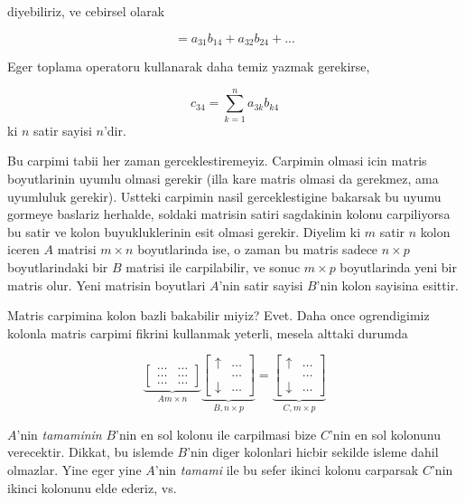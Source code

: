 \documentclass[12pt,fleqn]{article}\usepackage{../common}
\begin{document}
diyebiliriz, ve cebirsel olarak

$$ = a_{31}b_{14} + a_{32}b_{24} + ... $$

Eger toplama operatoru kullanarak daha temiz yazmak gerekirse,

$$ c_{34} = \sum_{k=1}^{n} a_{3k}b_{k4} $$
ki $n$ satir sayisi $n$'dir. 

Bu carpimi tabii her zaman gerceklestiremeyiz. Carpimin olmasi icin matris
boyutlarinin uyumlu olmasi gerekir (illa kare matris olmasi da gerekmez,
ama uyumluluk gerekir). Ustteki carpimin nasil gerceklestigine bakarsak bu
uyumu gormeye baslariz herhalde, soldaki matrisin satiri sagdakinin kolonu
carpiliyorsa bu satir ve kolon buyukluklerinin esit olmasi gerekir. Diyelim
ki $m$ satir $n$ kolon iceren $A$ matrisi $m \times n$ boyutlarinda ise, o
zaman bu matris sadece $n \times p$ boyutlarindaki bir $B$ matrisi ile
carpilabilir, ve sonuc $m \times p$ boyutlarinda yeni bir matris
olur. Yeni matrisin boyutlari $A$'nin satir sayisi $B$'nin kolon sayisina
esittir. 

Matris carpimina kolon bazli bakabilir miyiz? Evet. Daha once ogrendigimiz
kolonla matris carpimi fikrini kullanmak yeterli, mesela alttaki durumda

$$ 
\underbrace{
\left[\begin{array}{rr}
\dots & \dots   \\
\dots & \dots   \\
\dots & \dots 
\end{array}\right]
}_{A m \times n}
\underbrace{
\left[\begin{array}{rr}
\uparrow &  \dots\\
&  \dots\\
\downarrow & \dots 
\end{array}\right] 
}_{B, n \times p}
=
\underbrace{
\left[\begin{array}{rr}
\uparrow &  \dots \\
&  \dots \\
\downarrow & \dots
\end{array}\right] 
}_{C, m \times p}
$$

$A$'nin {\em tamaminin} $B$'nin en sol kolonu ile carpilmasi bize $C$'nin
en sol kolonunu verecektir. Dikkat, bu islemde $B$'nin diger kolonlari
hicbir sekilde isleme dahil olmazlar. Yine eger yine $A$'nin {\em tamami}
ile bu sefer ikinci kolonu carparsak $C$'nin ikinci kolonunu elde ederiz,
vs.
\end{document}
